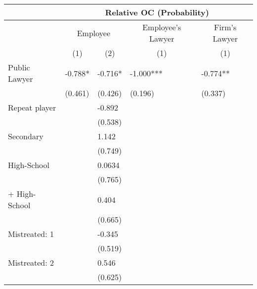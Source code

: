 \begin{tabular}{lrrrr}
\toprule
      & \multicolumn{4}{c}{Relative OC (Probability)} \\
\midrule
      & \multicolumn{2}{c}{Employee} & \multicolumn{1}{c}{Employee's Lawyer} & \multicolumn{1}{c}{Firm's  Lawyer} \\
      & \multicolumn{1}{c}{(1)} & \multicolumn{1}{c}{(2)} & \multicolumn{1}{c}{(1)} & \multicolumn{1}{c}{(1)} \\
Public Lawyer & \multicolumn{1}{l}{-0.788*} & \multicolumn{1}{l}{-0.716*} & \multicolumn{1}{l}{-1.000***} & \multicolumn{1}{l}{-0.774**} \\
      & \multicolumn{1}{l}{(0.461)} & \multicolumn{1}{l}{(0.426)} & \multicolumn{1}{l}{(0.196)} & \multicolumn{1}{l}{(0.337)} \\
Repeat player & \multicolumn{1}{l}{} & \multicolumn{1}{l}{-0.892} & \multicolumn{1}{l}{} & \multicolumn{1}{l}{} \\
      & \multicolumn{1}{l}{} & \multicolumn{1}{l}{(0.538)} & \multicolumn{1}{l}{} & \multicolumn{1}{l}{} \\
Secondary & \multicolumn{1}{l}{} & \multicolumn{1}{l}{1.142} & \multicolumn{1}{l}{} & \multicolumn{1}{l}{} \\
      & \multicolumn{1}{l}{} & \multicolumn{1}{l}{(0.749)} & \multicolumn{1}{l}{} & \multicolumn{1}{l}{} \\
High-School & \multicolumn{1}{l}{} & \multicolumn{1}{l}{0.0634} & \multicolumn{1}{l}{} & \multicolumn{1}{l}{} \\
      & \multicolumn{1}{l}{} & \multicolumn{1}{l}{(0.765)} & \multicolumn{1}{l}{} & \multicolumn{1}{l}{} \\
+ High-School & \multicolumn{1}{l}{} & \multicolumn{1}{l}{0.404} & \multicolumn{1}{l}{} & \multicolumn{1}{l}{} \\
      & \multicolumn{1}{l}{} & \multicolumn{1}{l}{(0.665)} & \multicolumn{1}{l}{} & \multicolumn{1}{l}{} \\
Mistreated: 1 & \multicolumn{1}{l}{} & \multicolumn{1}{l}{-0.345} & \multicolumn{1}{l}{} & \multicolumn{1}{l}{} \\
      & \multicolumn{1}{l}{} & \multicolumn{1}{l}{(0.519)} & \multicolumn{1}{l}{} & \multicolumn{1}{l}{} \\
Mistreated: 2 & \multicolumn{1}{l}{} & \multicolumn{1}{l}{0.546} & \multicolumn{1}{l}{} & \multicolumn{1}{l}{} \\
      & \multicolumn{1}{l}{} & \multicolumn{1}{l}{(0.625)} & \multicolumn{1}{l}{} & \multicolumn{1}{l}{} \\

\end{tabular}
